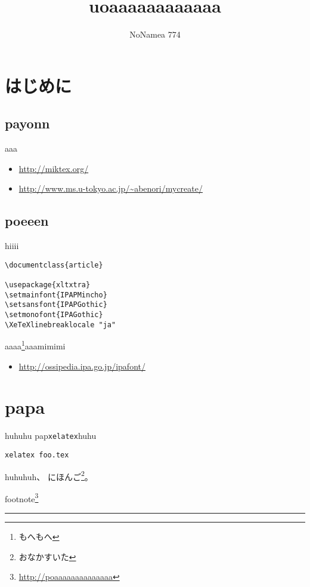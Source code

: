 \documentclass[twocolumn,8pt,b5paper]{extarticle}
\title{uoaaaaaaaaaaaa}
\author{NoNamea 774}
\newcommand{\vs}{\vspace{\baselineskip}}
\begin{document}
\maketitle

\section{はじめに}
\subsection{payonn}
aaa
\begin{itemize}
\item \url{http://miktex.org/}
\item \url{http://www.ms.u-tokyo.ac.jp/~abenori/mycreate/}
\end{itemize}

\subsection{poeeen}
hiiii
\begin{lstlisting}[frame=single]
\documentclass{article}

\usepackage{xltxtra}
\setmainfont{IPAPMincho}
\setsansfont{IPAPGothic}
\setmonofont{IPAGothic}
\XeTeXlinebreaklocale "ja"

\end{lstlisting}

aaaa\footnote{もへもへ}aaamimimi
\begin{itemize}
\item \url{http://ossipedia.ipa.go.jp/ipafont/}
\end{itemize}

\section{papa}
huhuhu
pap{\tt xelatex}huhu

\begin{lstlisting}[frame=shadowbox]
xelatex foo.tex
\end{lstlisting}

\newpage

huhuhuh、
にほんご\footnote[42]{おなかすいた}。


footnote\footnote{\url{http://poaaaaaaaaaaaaaa}}

\vs
\hrule

\null\vfill
\end{document}
